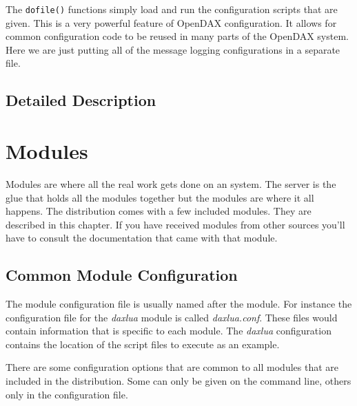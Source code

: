 	The \texttt{dofile()} functions simply load and run the configuration scripts
	that are given.  This is a very powerful feature of OpenDAX configuration.  It
	allows for common configuration code to be reused in many parts of the OpenDAX
	system.  Here we are just putting all of the message logging configurations in a
	separate file.

    \section{Detailed Description}



	\chapter{Modules}
	Modules are where all the real work gets done on an \opendax system.  The server
	is the glue that holds all the modules together but the modules are where it all
	happens.  The \opendax distribution comes with a few included modules.  They are
	described in this chapter.  If you have received modules from other sources
	you'll have to consult the documentation that came with that module.

	\section{Common Module Configuration}

	The module configuration file is usually named after the module.  For instance
	the configuration file for the \emph{daxlua} module is called
	\emph{daxlua.conf}.  These files would contain information that is specific to
	each module.  The \emph{daxlua} configuration contains the location of the
	script files to execute as an example.

	There are some configuration options that are common to all modules that are
	included in the distribution.  Some can only be given on the command line,
	others only in the configuration file.

